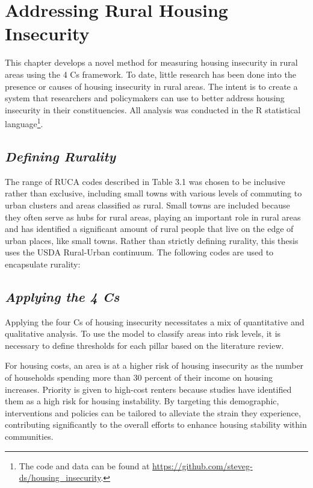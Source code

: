 \chapter{Addressing Rural Housing Insecurity}	%

This chapter develops a novel method for measuring housing insecurity in rural areas using the 4 Cs framework. To date, little research has been done into the presence or causes of housing insecurity in rural areas. The intent is to create a system that researchers and policymakers can use to better address housing insecurity in their constituencies. All analysis was conducted in the R statistical language\footnote{The code and data can be found at \url{https://github.com/steveg-ds/housing_insecurity}.}.


\section{\textit{Defining Rurality}}
The range of RUCA codes described in Table 3.1 was chosen to be inclusive rather than exclusive, including small towns with various levels of commuting to urban clusters and areas classified as rural. Small towns are included because they often serve as hubs for rural areas, playing an important role in rural areas and \citet{isserman_national_2005} has identified a significant amount of rural people that live on the edge of urban places, like small towns. Rather than strictly defining rurality, this thesis uses the USDA Rural-Urban continuum. The following codes are used to encapsulate rurality:


 

\section{\textit{Applying the 4 Cs}}
Applying the four Cs of housing insecurity necessitates a mix of quantitative and qualitative analysis. To use the model to classify areas into risk levels, it is necessary to define thresholds for each pillar based on the literature review. 

For housing costs, an area is at a higher risk of housing insecurity as the number of households spending more than 30 percent of their income on housing increases. Priority is given to high-cost renters because studies have identified them as a high risk for housing instability. By targeting this demographic, interventions and policies can be tailored to alleviate the strain they experience, contributing significantly to the overall efforts to enhance housing stability within communities.

